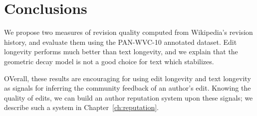 \section{Conclusions}

We propose two measures of revision quality computed
from Wikipedia's revision history, and evaluate them
using the PAN-WVC-10 annotated dataset.
Edit longevity performs much better than text longevity,
and we explain that the geometric decay model is not
a good choice for text which stabilizes.

OVerall, these results are encouraging for using edit
longevity and text longevity as signals for inferring
the community feedback of an author's edit.
Knowing the quality of edits, we can build an author
reputation system upon these signals; we describe such
a system in Chapter~\ref{ch:reputation}.

